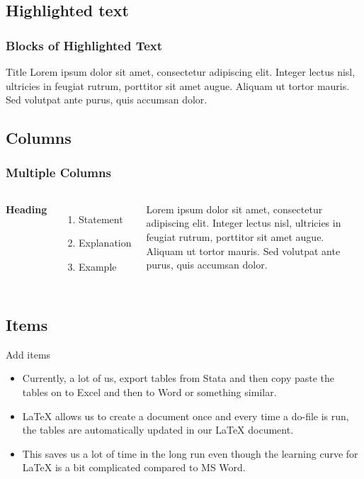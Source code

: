 \documentclass{beamer}
\begin{document}
\subsection{Highlighted text}
\begin{frame}
\frametitle{Blocks of Highlighted Text}
\begin{block}{Title}
	Lorem ipsum dolor sit amet, consectetur adipiscing elit. Integer lectus nisl, ultricies in feugiat rutrum, porttitor sit amet augue. Aliquam ut tortor mauris. Sed volutpat ante purus, quis accumsan dolor.
\end{block}


\end{frame}

\subsection{Columns}
\begin{frame}
\frametitle{Multiple Columns}
\begin{columns}[c] %
	
	\textbf{Heading}
	\begin{enumerate}
		\item Statement
		\item Explanation
		\item Example
	\end{enumerate}
	
	Lorem ipsum dolor sit amet, consectetur adipiscing elit. Integer lectus nisl, ultricies in feugiat rutrum, porttitor sit amet augue. Aliquam ut tortor mauris. Sed volutpat ante purus, quis accumsan dolor.
	
\end{columns}
\end{frame}

\subsection{Items}
\begin{frame}{Add items}	

\begin{itemize}
	\item Currently, a lot of us, export tables from Stata and then copy paste the tables on to Excel and then to Word or something similar. 
	\item {\LaTeX} allows us to create a document once and every time a do-file is run, the tables are automatically updated in our {\LaTeX} document.
	\item This saves us a lot of time in the long run even though the learning curve for {\LaTeX} is a bit complicated compared to MS Word. 
	
\end{itemize}
\end{frame}
\end{document}
